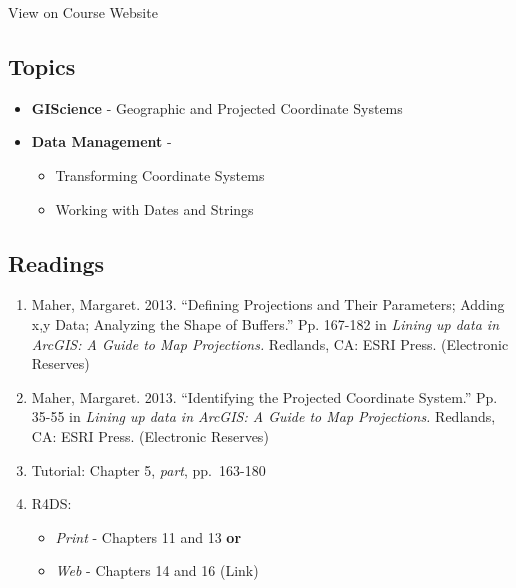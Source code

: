 \documentclass[
]{book}
\providecommand{\tightlist}{%
  \setlength{\itemsep}{0pt}\setlength{\parskip}{0pt}}
\begin{document}
View on Course Website

\hypertarget{topics-10}{%
\subsection*{Topics}\label{topics-10}}

\begin{itemize}
\tightlist
\item
  \textbf{GIScience} - Geographic and Projected Coordinate Systems
\item
  \textbf{Data Management} -

  \begin{itemize}
  \tightlist
  \item
    Transforming Coordinate Systems
  \item
    Working with Dates and Strings
  \end{itemize}
\end{itemize}

\hypertarget{readings-10}{%
\subsection*{Readings}\label{readings-10}}

\begin{enumerate}
\def\labelenumi{\arabic{enumi}.}
\tightlist
\item
  Maher, Margaret. 2013. ``Defining Projections and Their Parameters; Adding x,y Data; Analyzing the Shape of Buffers.'' Pp. 167-182 in \emph{Lining up data in ArcGIS: A Guide to Map Projections.} Redlands, CA: ESRI Press. (Electronic Reserves)
\item
  Maher, Margaret. 2013. ``Identifying the Projected Coordinate System.'' Pp. 35-55 in \emph{Lining up data in ArcGIS: A Guide to Map Projections.} Redlands, CA: ESRI Press. (Electronic Reserves)
\item
  Tutorial: Chapter 5, \emph{part}, pp.~163-180
\item
  R4DS:

  \begin{itemize}
  \tightlist
  \item
    \emph{Print} - Chapters 11 and 13 \textbf{or}
  \item
    \emph{Web} - Chapters 14 and 16 (Link)
  \end{itemize}
\end{enumerate}
\end{document}
